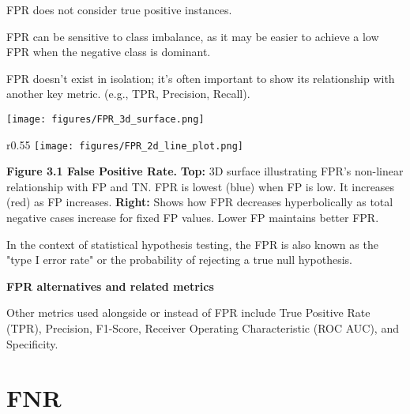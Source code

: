 {
\item FPR does not consider true positive instances.
\item FPR can be sensitive to class imbalance, as it may be easier to achieve a low FPR when the negative class is dominant.
\item FPR doesn't exist in isolation; it's often important to show its relationship with another key metric. (e.g., TPR, Precision, Recall).
}


\clearpage
\thispagestyle{customstyle}


\begin{figure*}[ht!]
    \centering
    \texttt{[image: figures/FPR\_3d\_surface.png]}
    \label{fig1}
\end{figure*}

\begin{wrapfigure}{r}{0.55\textwidth}
    \centering
    \vspace{-20pt} %
    \texttt{[image: figures/FPR\_2d\_line\_plot.png]} %
\end{wrapfigure}

\textbf{Figure 3.1 False Positive Rate.} 
\textbf{Top:}
3D surface illustrating FPR's non-linear relationship with FP and TN. FPR is lowest (blue) when FP is low. It increases (red) as FP increases.
\textbf{Right:}
Shows how FPR decreases hyperbolically as total negative cases increase for fixed FP values. Lower FP maintains better FPR.


{
In the context of statistical hypothesis testing, the FPR is also known as the "type I error rate" or the probability of rejecting a true null hypothesis.
}

\textbf{FPR alternatives and related metrics}

Other metrics used alongside or instead of FPR include True Positive Rate (TPR), Precision, F1-Score, Receiver Operating Characteristic (ROC AUC), and Specificity.


\clearpage
\section{FNR}
